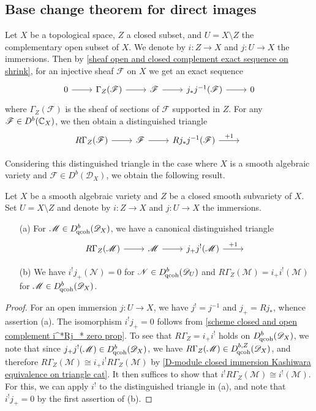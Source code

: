 \subsection{Base change theorem for direct images}
Let $X$ be a topological space, $Z$ a closed subset, and $U=X\setminus Z$ the complementary open subset of $X$. We denote by $i:Z\to X$ and $j:U\to X$ the immersions. Then by \cref{sheaf open and closed complement exact sequence on shrink}, for an injective sheaf $\mathscr{F}$ on $X$ we get an exact sequence
\[\begin{tikzcd}
0\ar[r]&\Gamma_Z(\mathscr{F})\ar[r]&\mathscr{F}\ar[r]&j_*j^{-1}(\mathscr{F})\ar[r]&0
\end{tikzcd}\]
where $\Gamma_Z(\mathscr{F})$ is the sheaf of sections of $\mathscr{F}$ supported in $Z$. For any $\mathscr{F}\in D^b(\mathbb{C}_X)$, we then obtain a distinguished triangle
\[\begin{tikzcd}
R\Gamma_Z(\mathscr{F})\ar[r]&\mathscr{F}\ar[r]&Rj_*j^{-1}(\mathscr{F})\ar[r,"+1"]&{}
\end{tikzcd}\]

Considering this distinguished triangle in the case where $X$ is a smooth algebraic variety and $\mathscr{F}\in D^b(\mathscr{D}_X)$, we obtain the following result.
\begin{proposition}\label{D-module open and closed complement dt of shrink}
Let $X$ be a smooth algebraic variety and $Z$ be a closed smooth subvariety of $X$. Set $U=X\setminus Z$ and denote by $i:Z\to X$ and $j:U\to X$ the immersions.
\begin{enumerate}
    \item[(a)] For $\mathscr{M}\in D_{\!\mathrm{qcoh}}^b(\mathscr{D}_X)$, we have a canonical distinguished triangle
    \[\begin{tikzcd}
    R\Gamma_Z(\mathscr{M})\ar[r]&\mathscr{M}\ar[r]&j_+j^!(\mathscr{M})\ar[r,"+1"]&{}
    \end{tikzcd}\]
    \item[(b)] We have $i^!j_+(\mathscr{N})=0$ for $\mathscr{N}\in D^b_{\!\mathrm{qcoh}}(\mathscr{D}_U)$ and $R\Gamma_Z(\mathscr{M})=i_+i^!(\mathscr{M})$ for $\mathscr{M}\in D^b_{\!\mathrm{qcoh}}(\mathscr{D}_X)$.
\end{enumerate}
\end{proposition}
\begin{proof}
For an open immersion $j:U\to X$, we have $j^!=j^{-1}$ and $j_+=Rj_*$, whence assertion (a). The isomorphism $i^!j_+=0$ follows from \cref{scheme closed and open complement i^*Rj_* zero prop}. To see that $R\Gamma_Z=i_+i^!$ holds on $D^b_{\!\mathrm{qcoh}}(\mathscr{D}_X)$, we note that since $j_+j^!(\mathscr{M})\in D^b_{\!\mathrm{qcoh}}(\mathscr{D}_X)$, we have $R\Gamma_Z(\mathscr{M})\in D_{\!\mathrm{qcoh}}^{b,Z}(\mathscr{D}_X)$, and therefore $R\Gamma_Z(\mathscr{M})\cong i_+i^!R\Gamma_Z(\mathscr{M})$ by \cref{D-module closed immersion Kashiwara equivalence on triangle cat}. It then suffices to show that $i^!R\Gamma_Z(\mathscr{M})\cong i^!(\mathscr{M})$. For this, we can apply $i^!$ to the distinguished triangle in (a), and note that $i^!j_+=0$ by the first assertion of (b).
\end{proof}

